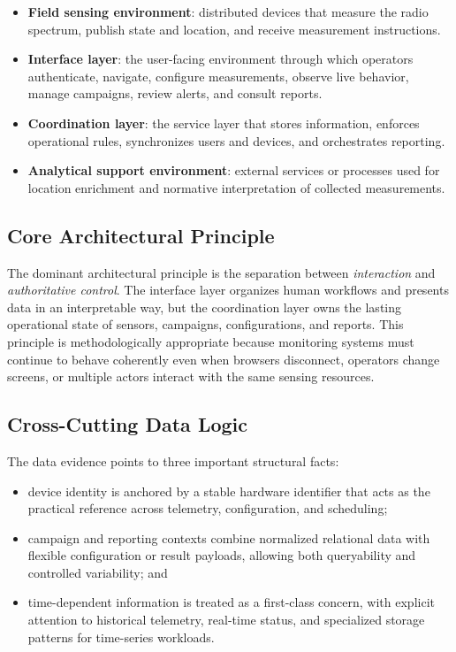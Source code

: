 \documentclass[11pt,a4paper]{article}
\begin{document}
\begin{itemize}
  \item \textbf{Field sensing environment}: distributed devices that measure the radio spectrum, publish state and location, and receive measurement instructions.
  \item \textbf{Interface layer}: the user-facing environment through which operators authenticate, navigate, configure measurements, observe live behavior, manage campaigns, review alerts, and consult reports.
  \item \textbf{Coordination layer}: the service layer that stores information, enforces operational rules, synchronizes users and devices, and orchestrates reporting.
  \item \textbf{Analytical support environment}: external services or processes used for location enrichment and normative interpretation of collected measurements.
\end{itemize}

\subsection{Core Architectural Principle}
The dominant architectural principle is the separation between \textit{interaction} and \textit{authoritative control}. The interface layer organizes human workflows and presents data in an interpretable way, but the coordination layer owns the lasting operational state of sensors, campaigns, configurations, and reports. This principle is methodologically appropriate because monitoring systems must continue to behave coherently even when browsers disconnect, operators change screens, or multiple actors interact with the same sensing resources.

\subsection{Cross-Cutting Data Logic}
The data evidence points to three important structural facts:

\begin{itemize}
  \item device identity is anchored by a stable hardware identifier that acts as the practical reference across telemetry, configuration, and scheduling;
  \item campaign and reporting contexts combine normalized relational data with flexible configuration or result payloads, allowing both queryability and controlled variability; and
  \item time-dependent information is treated as a first-class concern, with explicit attention to historical telemetry, real-time status, and specialized storage patterns for time-series workloads.
\end{itemize}
\end{document}
